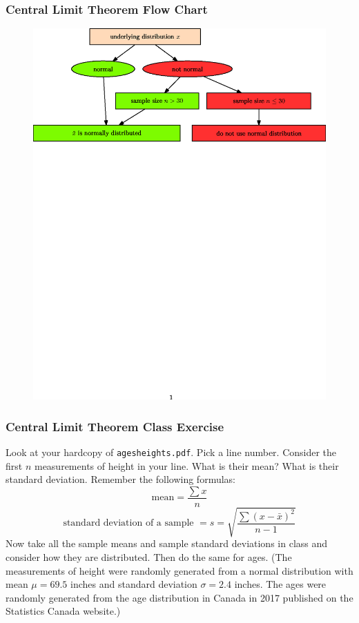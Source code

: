\documentclass[xcolor=dvipsnames]{beamer}
\begin{document}
\begin{frame}
  \frametitle{Central Limit Theorem Flow Chart}
\begin{figure}[h]
\includegraphics[scale=.7]{./diagrams/CentralLimitTheorem.eps}
\end{figure}
\end{frame}

\begin{frame}
  \frametitle{Central Limit Theorem Class Exercise}
Look at your hardcopy of \texttt{agesheights.pdf}. Pick a line number.
Consider the first $n$ measurements of height in your line. What is
their mean? What is their standard deviation. Remember the following
formulas:
  \begin{equation}
    \label{eq:daechuev}
    \mbox{mean}=\frac{\sum{}x}{n}
  \end{equation}
\begin{equation}
  \label{eq:xeiroong}
   \mbox{standard deviation of a sample }=s=\sqrt{\frac{\sum{}(x-\bar{x})^{2}}{n-1}}
\end{equation}
Now take all the sample means and sample standard deviations in class
and consider how they are distributed. Then do the same for ages. (The
measurements of height were randomly generated from a normal
distribution with mean $\mu=69.5$ inches and standard deviation
$\sigma=2.4$ inches. The ages were randomly generated from the age
distribution in Canada in 2017 published on the Statistics Canada
website.)
\end{frame}
\end{document}
